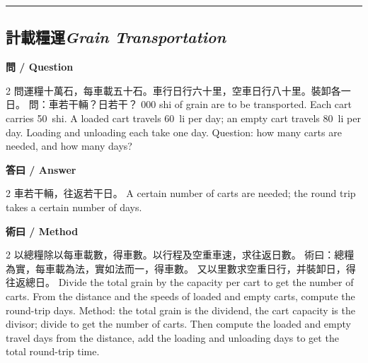 \documentclass[11pt,a4paper]{article}
\newcommand{\bilingualsubsection}[2]{\subsection{#1\quad\textit{#2}}}
\newcommand{\longline}{\noindent\rule{\textwidth}{0.4pt}}
\begin{document}
\vspace{0.5em}
\longline

\bilingualsubsection{計載糧運}{Grain Transportation}

\vspace{0.4em}
\noindent\textbf{\textcolor{chinesecolor}{問} / \textcolor{englishcolor}{Question}}
\vspace{0.3em}
\begin{paracol}{2}
問運糧十萬石，每車載五十石。車行日行六十里，空車日行八十里。裝卸各一日。
問：車若干輛？日若干？
000 shi of grain are to be transported. Each cart carries 50~shi.
A loaded cart travels 60~li per day; an empty cart travels 80~li per day.
Loading and unloading each take one day. Question: how many carts are needed,
and how many days?
\end{paracol}

\vspace{0.4em}
\noindent\textbf{\textcolor{chinesecolor}{答曰} / \textcolor{englishcolor}{Answer}}
\vspace{0.2em}
\begin{paracol}{2}
車若干輛，往返若干日。
\switchcolumn
A certain number of carts are needed; the round trip takes a certain number
of days.
\end{paracol}

\vspace{0.4em}
\noindent\textbf{\textcolor{chinesecolor}{術曰} / \textcolor{englishcolor}{Method}}
\vspace{0.2em}
\begin{paracol}{2}
以總糧除以每車載數，得車數。以行程及空重車速，求往返日數。
術曰：總糧為實，每車載為法，實如法而一，得車數。
又以里數求空重日行，并裝卸日，得往返總日。
\switchcolumn
Divide the total grain by the capacity per cart to get the number of carts.
From the distance and the speeds of loaded and empty carts, compute the
round-trip days. Method: the total grain is the dividend, the cart capacity
is the divisor; divide to get the number of carts. Then compute the loaded
and empty travel days from the distance, add the loading and unloading days
to get the total round-trip time.
\end{paracol}
\end{document}
